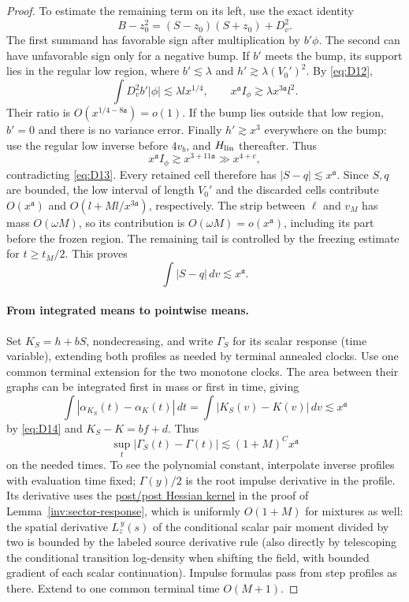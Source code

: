\begin{proof}
To estimate the remaining term on its left, use the exact identity
\[
 B-z_0^2=(S-z_0)(S+z_0)+D_v^2.
\]
The first summand has favorable sign after multiplication by
$b'\phi$.  The second can have unfavorable sign only for a negative
bump.  If $b'$ meets the bump, its support lies in the regular low
region, where $b'\lesssim\lambda$ and
$h'\gtrsim\lambda(V_0')^2$.  By \eqref{eq:D12},
\[
 \int D_v^2b'|\phi|\lesssim\lambda l x^{1/4},\qquad
 x^{\mathfrak a}I_\phi
       \gtrsim\lambda x^{3\mathfrak a}l^2.
\]
Their ratio is $O(x^{1/4-8\mathfrak a})=o(1)$.  If the bump lies
outside that low region, $b'=0$ and there is no variance error.
Finally $h'\gtrsim x^3$ everywhere on the bump: use the regular low
inverse before $4v_b$, and $H_{\rm lin}$ thereafter.  Thus
\[
 x^{\mathfrak a}I_\phi\gtrsim x^{3+11\mathfrak a}
       \gg x^{4+c},
\]
contradicting \eqref{eq:D13}.  Every retained cell therefore has
$|S-q|\lesssim x^{\mathfrak a}$.  Since $S,q$ are bounded, the low
interval of length $V_0'$ and the discarded cells contribute
$O(x^{\mathfrak a})$ and $O(l+Ml/x^{3\mathfrak a})$, respectively.
The strip between $\ell$ and $v_M$ has mass $O(\omega M)$, so its
contribution is $O(\omega M)=o(x^{\mathfrak a})$, including its part
before the frozen region.  The remaining tail is controlled by the
freezing estimate for $t\ge t_M/2$.  This proves
\begin{equation}
\int |S-q|\,dv\lesssim x^{\mathfrak a}.         \tag{D14}\label{eq:D14}
\end{equation}

\paragraph{From integrated means to pointwise means.}
Set \(K_S=h+b S\), nondecreasing, and write \(\Gamma_S\) for its scalar response (time variable), extending both profiles as needed by terminal annealed clocks. Use one common terminal extension for the two monotone clocks.
The area between their graphs can be integrated first in mass or first
in time, giving
\[
 \int|\alpha_{K_S}(t)-\alpha_K(t)|\,dt
       =\int|K_S(v)-K(v)|\,dv
       \lesssim x^{\mathfrak a}
\]
by \eqref{eq:D14} and $K_S-K=bf+d$.  Thus
\begin{equation*}
\sup_t|\Gamma_S(t)-\Gamma(t)|\lesssim (1+M)^C x^{\mathfrak a}
\end{equation*}
on the needed times. To see the polynomial constant, interpolate inverse profiles with evaluation time fixed; \(\Gamma(y)/2\) is the root impulse derivative in the profile. Its derivative uses the \hyperref[par:inverse-kernel-estimates]{post/post Hessian kernel} in the proof of Lemma~\ref{inv:sector-response}, which is uniformly \(O(1+M)\) for mixtures as well: the spatial derivative \(L_z^{\,y}(s)\) of the conditional scalar pair moment divided by two is bounded by the labeled source derivative rule (also directly by telescoping the conditional transition log-density when shifting the field, with bounded gradient of each scalar continuation). Impulse formulas pass from step profiles as there. Extend to one common terminal time \(O(M+1)\).


\end{proof}
